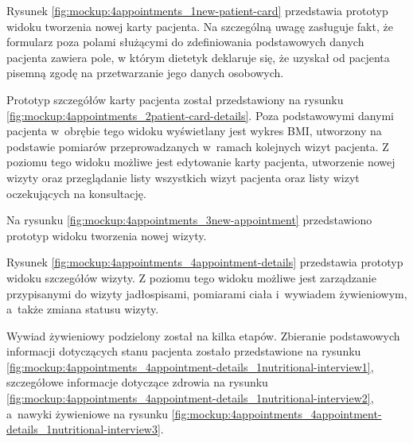 
Rysunek \ref{fig:mockup:4appointments_1new-patient-card} przedstawia prototyp widoku tworzenia nowej karty pacjenta.
Na szczególną uwagę zasługuje fakt, że formularz poza polami służącymi do zdefiniowania podstawowych danych pacjenta zawiera pole,
w którym dietetyk deklaruje się, że uzyskał od pacjenta pisemną zgodę na przetwarzanie jego danych osobowych.


Prototyp szczegółów karty pacjenta został przedstawiony na rysunku \ref{fig:mockup:4appointments_2patient-card-details}.
Poza podstawowymi danymi pacjenta w~obrębie tego widoku wyświetlany jest wykres BMI, utworzony na podstawie pomiarów przeprowadzanych w~ramach kolejnych wizyt pacjenta.
Z poziomu tego widoku możliwe jest edytowanie karty pacjenta, utworzenie nowej wizyty oraz przeglądanie listy wszystkich wizyt pacjenta oraz listy wizyt oczekujących na konsultację.


Na rysunku \ref{fig:mockup:4appointments_3new-appointment} przedstawiono prototyp widoku tworzenia nowej wizyty.


Rysunek \ref{fig:mockup:4appointments_4appointment-details} przedstawia prototyp widoku szczegółów wizyty.
Z poziomu tego widoku możliwe jest zarządzanie przypisanymi do wizyty jadłospisami, pomiarami ciała i~wywiadem żywieniowym, a~także zmiana statusu wizyty.


Wywiad żywieniowy podzielony został na kilka etapów. Zbieranie podstawowych informacji dotyczących stanu pacjenta zostało przedstawione na rysunku \ref{fig:mockup:4appointments_4appointment-details_1nutritional-interview1},
szczegółowe informacje dotyczące zdrowia na rysunku \ref{fig:mockup:4appointments_4appointment-details_1nutritional-interview2}, a~nawyki żywieniowe na rysunku \ref{fig:mockup:4appointments_4appointment-details_1nutritional-interview3}.

